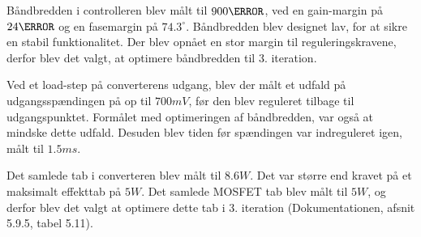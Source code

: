 Båndbredden i controlleren blev målt til $900\hertz$, ved en gain-margin på $24\decibel$ og en fasemargin på $74.3^\circ$. Båndbredden blev designet lav, for at sikre en stabil funktionalitet. Der blev opnået en stor margin til reguleringskravene, derfor blev det valgt, at optimere båndbredden til 3. iteration. 

Ved et load-step på converterens udgang, blev der målt et udfald på udgangsspændingen på op til $700mV$, før den blev reguleret tilbage til udgangspunktet. Formålet med optimeringen af båndbredden, var også at mindske dette udfald. Desuden blev tiden før spændingen var indreguleret igen, målt til $1.5ms$. 

Det samlede tab i converteren blev målt til $8.6W$. Det var større end kravet på et maksimalt effekttab på $5W$. Det samlede MOSFET tab blev målt til $5W$, og derfor blev det valgt at optimere dette tab i 3. iteration (Dokumentationen, afsnit 5.9.5, tabel 5.11). 








